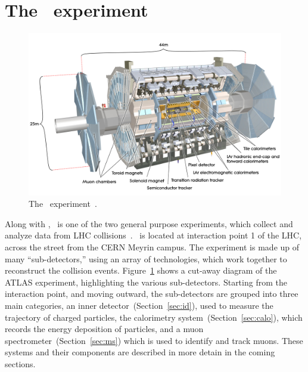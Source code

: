 \FloatBarrier
\section{The \atlas\ experiment}

\begin{figure}[ht]
  \centering
  \includegraphics[width=\textwidth, clip=true, trim=0 0 0 0]
    {figs/lhc/atlas_det.jpg}
  \caption{
    The \atlas\ experiment~\cite{Pequenao:1095924}.
  }
  \label{fig:atlas_det}
\end{figure}

Along with \cms, \atlas\ is one of the two general purpose experiments, which
collect and analyze data from LHC collisions~\cite{cern-jinst-atlas}.
\atlas\ is located at interaction point 1 of the LHC, across the street from
the CERN Meyrin campus.
The experiment is made up of many ``sub-detectors,'' using an array of
technologies, which work together to reconstruct the collision events.
Figure~\ref{fig:atlas_det} shows a cut-away diagram of the ATLAS experiment,
highlighting the various sub-detectors.
Starting from the interaction point, and moving outward, the sub-detectors
are grouped into three main categories, an inner
detector~(Section~\ref{sec:id}), used to measure the trajectory of charged
particles, the calorimetry system~(Section~\ref{sec:calo}), which records the
energy deposition of particles, and a muon spectrometer~(Section~\ref{sec:ms})
which is used to identify and track muons.
These systems and their components are described in more detain in the coming
sections.

